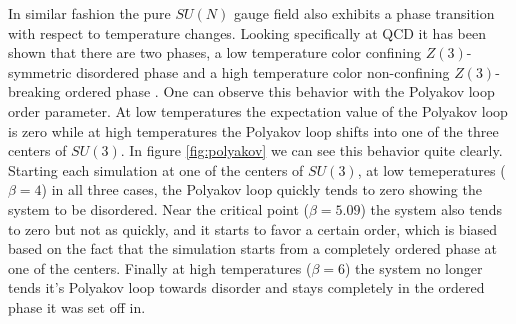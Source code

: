 \documentclass[english,twoside,openright]{UH_TCM_MSc}
\begin{document}
In similar fashion the pure $SU(N)$ gauge field also exhibits a phase transition with respect to temperature changes. Looking specifically at QCD it has been shown that there are two phases, a low temperature color confining $Z(3)$-symmetric disordered phase and a high temperature color non-confining $Z(3)$-breaking ordered phase \cite{POLYAKOV1978477,PhysRevD.20.2610}. One can observe this behavior with the Polyakov loop order parameter. At low temperatures the expectation value of the Polyakov loop is zero while at high temperatures the Polyakov loop shifts into one of the three centers of $SU(3)$. In figure \ref{fig:polyakov} we can see this behavior quite clearly. Starting each simulation at one of the centers of $SU(3)$, at low temeperatures ($\beta=4$) in all three cases, the Polyakov loop quickly tends to zero showing the system to be disordered. Near the critical point ($\beta=5.09$) the system also tends to zero but not as quickly, and it starts to favor a certain order, which is biased based on the fact that the simulation starts from a completely ordered phase at one of the centers. Finally at high temperatures ($\beta=6$) the system no longer tends it's Polyakov loop towards disorder and stays completely in the ordered phase it was set off in. 
\end{document}
